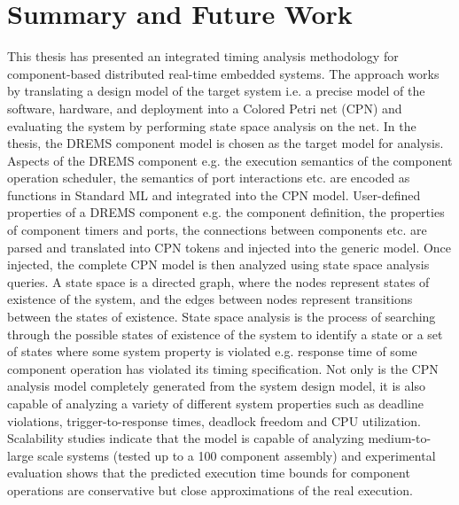 \chapter{Summary and Future Work}
\label{chapter:conclusion}

This thesis has presented an integrated timing analysis methodology for component-based distributed real-time embedded systems. The approach works by translating a design model of the target system i.e. a precise model of the software, hardware, and deployment into a Colored Petri net (CPN) and evaluating the system by performing state space analysis on the net. In the thesis, the DREMS component model is chosen as the target model for analysis. Aspects of the DREMS component e.g. the execution semantics of the component operation scheduler, the semantics of port interactions etc. are encoded as functions in Standard ML and integrated into the CPN model. User-defined properties of a DREMS component e.g. the component definition, the properties of component timers and ports, the connections between components etc. are parsed and translated into CPN tokens and injected into the generic model. Once injected, the complete CPN model is then analyzed using state space analysis queries. A state space is a directed graph, where the nodes represent states of existence of the system, and the edges between nodes represent transitions between the states of existence. State space analysis is the process of searching through the possible states of existence of the system to identify a state or a set of states where some system property is violated e.g. response time of some component operation has violated its timing specification. Not only is the CPN analysis model completely generated from the system design model, it is also capable of analyzing a variety of different system properties such as deadline violations, trigger-to-response times, deadlock freedom and CPU utilization. Scalability studies indicate that the model is capable of analyzing medium-to-large scale systems (tested up to a 100 component assembly) and experimental evaluation shows that the predicted execution time bounds for component operations are conservative but close approximations of the real execution.

